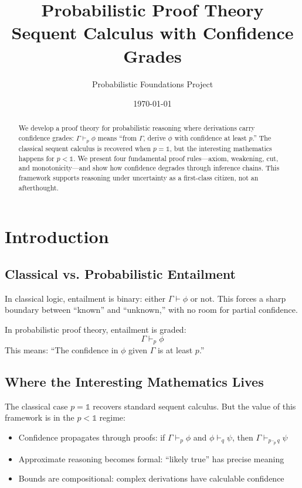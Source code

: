 \documentclass[11pt,a4paper]{article}
\title{Probabilistic Proof Theory\\[0.5em]
\large Sequent Calculus with Confidence Grades}
\author{Probabilistic Foundations Project}
\date{\today}
\newcommand{\pone}{\mathbb{1}}
\newcommand{\pmul}{\cdot_p}
\newcommand{\entails}[1]{\vdash_{#1}}
\begin{document}
\maketitle

\begin{abstract}
We develop a proof theory for probabilistic reasoning where derivations carry confidence grades: $\Gamma \entails{p} \phi$ means ``from $\Gamma$, derive $\phi$ with confidence at least $p$.'' The classical sequent calculus is recovered when $p = \pone$, but the interesting mathematics happens for $p < \pone$. We present four fundamental proof rules---axiom, weakening, cut, and monotonicity---and show how confidence degrades through inference chains. This framework supports reasoning under uncertainty as a first-class citizen, not an afterthought.
\end{abstract}

\section{Introduction}

\subsection{Classical vs. Probabilistic Entailment}

In classical logic, entailment is binary: either $\Gamma \vdash \phi$ or not. This forces a sharp boundary between ``known'' and ``unknown,'' with no room for partial confidence.

In probabilistic proof theory, entailment is graded:
\[
\Gamma \entails{p} \phi
\]
This means: ``The confidence in $\phi$ given $\Gamma$ is at least $p$.''

\subsection{Where the Interesting Mathematics Lives}

The classical case $p = \pone$ recovers standard sequent calculus. But the value of this framework is in the $p < \pone$ regime:

\begin{itemize}
    \item Confidence propagates through proofs: if $\Gamma \entails{p} \phi$ and $\phi \entails{q} \psi$, then $\Gamma \entails{p \pmul q} \psi$
    \item Approximate reasoning becomes formal: ``likely true'' has precise meaning
    \item Bounds are compositional: complex derivations have calculable confidence
\end{itemize}
\end{document}
